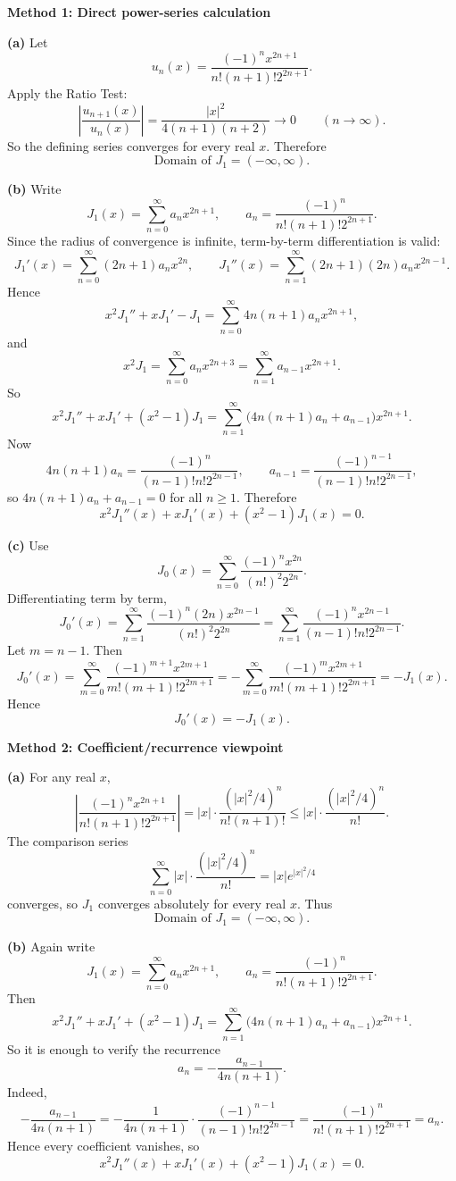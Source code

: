 \documentclass[a4paper,12pt,twocolumn]{article}
\newenvironment{solutionbox}{\begin{framed}}{\end{framed}}
\begin{document}
\begin{enumerate}[label=\textbf{\arabic*.}, leftmargin=2em, itemsep=1.2em]
\begin{solutionbox}
\textbf{Method 1: Direct power-series calculation}

\textbf{(a)} Let
\[
u_n(x)=\frac{(-1)^n x^{2n+1}}{n!(n+1)!2^{2n+1}}.
\]
Apply the Ratio Test:
\[
\left|\frac{u_{n+1}(x)}{u_n(x)}\right|
=
\frac{|x|^2}{4(n+1)(n+2)}\to 0
\qquad (n\to\infty).
\]
So the defining series converges for every real \(x\). Therefore
\[
\boxed{\text{Domain of }J_1=(-\infty,\infty).}
\]

\textbf{(b)} Write
\[
J_1(x)=\sum_{n=0}^{\infty}a_nx^{2n+1},
\qquad
a_n=\frac{(-1)^n}{n!(n+1)!2^{2n+1}}.
\]
Since the radius of convergence is infinite, term-by-term differentiation is valid:
\[
J_1'(x)=\sum_{n=0}^{\infty}(2n+1)a_nx^{2n},
\qquad
J_1''(x)=\sum_{n=1}^{\infty}(2n+1)(2n)a_nx^{2n-1}.
\]
Hence
\[
x^2J_1''+xJ_1'-J_1
=
\sum_{n=0}^{\infty}4n(n+1)a_nx^{2n+1},
\]
and
\[
x^2J_1
=
\sum_{n=0}^{\infty}a_nx^{2n+3}
=
\sum_{n=1}^{\infty}a_{n-1}x^{2n+1}.
\]
So
\[
x^2J_1''+xJ_1'+(x^2-1)J_1
=
\sum_{n=1}^{\infty}\bigl(4n(n+1)a_n+a_{n-1}\bigr)x^{2n+1}.
\]
Now
\[
4n(n+1)a_n
=
\frac{(-1)^n}{(n-1)!n!2^{2n-1}},
\qquad
a_{n-1}
=
\frac{(-1)^{n-1}}{(n-1)!n!2^{2n-1}},
\]
so \(4n(n+1)a_n+a_{n-1}=0\) for all \(n\ge 1\). Therefore
\[
\boxed{x^2J_1''(x)+xJ_1'(x)+(x^2-1)J_1(x)=0.}
\]

\textbf{(c)} Use
\[
J_0(x)=\sum_{n=0}^{\infty}\frac{(-1)^n x^{2n}}{(n!)^2 2^{2n}}.
\]
Differentiating term by term,
\[
J_0'(x)=\sum_{n=1}^{\infty}\frac{(-1)^n(2n)x^{2n-1}}{(n!)^2 2^{2n}}
=
\sum_{n=1}^{\infty}\frac{(-1)^n x^{2n-1}}{(n-1)!n!2^{2n-1}}.
\]
Let \(m=n-1\). Then
\[
J_0'(x)
=
\sum_{m=0}^{\infty}\frac{(-1)^{m+1}x^{2m+1}}{m!(m+1)!2^{2m+1}}
=
-\sum_{m=0}^{\infty}\frac{(-1)^m x^{2m+1}}{m!(m+1)!2^{2m+1}}
=
-J_1(x).
\]
Hence
\[
\boxed{J_0'(x)=-J_1(x).}
\]
\end{solutionbox}

\begin{solutionbox}
\textbf{Method 2: Coefficient/recurrence viewpoint}

\textbf{(a)} For any real \(x\),
\[
\left|\frac{(-1)^n x^{2n+1}}{n!(n+1)!2^{2n+1}}\right|
=
|x|\cdot \frac{(|x|^2/4)^n}{n!(n+1)!}
\le
|x|\cdot \frac{(|x|^2/4)^n}{n!}.
\]
The comparison series
\[
\sum_{n=0}^{\infty}|x|\cdot \frac{(|x|^2/4)^n}{n!}
=
|x|e^{|x|^2/4}
\]
converges, so \(J_1\) converges absolutely for every real \(x\). Thus
\[
\boxed{\text{Domain of }J_1=(-\infty,\infty).}
\]

\textbf{(b)} Again write
\[
J_1(x)=\sum_{n=0}^{\infty}a_nx^{2n+1},
\qquad
a_n=\frac{(-1)^n}{n!(n+1)!2^{2n+1}}.
\]
Then
\[
x^2J_1''+xJ_1'+(x^2-1)J_1
=
\sum_{n=1}^{\infty}\bigl(4n(n+1)a_n+a_{n-1}\bigr)x^{2n+1}.
\]
So it is enough to verify the recurrence
\[
a_n=-\frac{a_{n-1}}{4n(n+1)}.
\]
Indeed,
\[
-\frac{a_{n-1}}{4n(n+1)}
=
-\frac{1}{4n(n+1)}
\cdot
\frac{(-1)^{n-1}}{(n-1)!n!2^{2n-1}}
=
\frac{(-1)^n}{n!(n+1)!2^{2n+1}}
=
a_n.
\]
Hence every coefficient vanishes, so
\[
\boxed{x^2J_1''(x)+xJ_1'(x)+(x^2-1)J_1(x)=0.}
\]


\end{solutionbox}
\end{enumerate}
\end{document}
